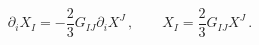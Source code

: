 \begin{equation}
\partial_i X_I = -\frac 23 G_{IJ} \partial_i X^J\,, \qquad
X_I = \frac 23 G_{IJ} X^J\,.
\end{equation}


